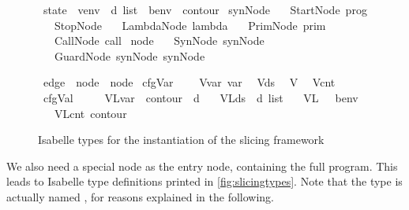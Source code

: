 \documentclass[a4paper,halfparskip,DIV=10,11pt]{scrbook}
\begin{document}
\begin{figure}
\begin{framed}
\begin{minipage}[t]{.5\linewidth}
\begin{isabellebody}
\isamarkupfalse%
\ state\ {\isacharequal}\ {\isachardoublequoteopen}venv\ {\isasymtimes}\ d\ list\ {\isasymtimes}\ benv\ {\isasymtimes}\ contour{\isachardoublequoteclose}\isanewline
\isanewline
{}\isamarkupfalse%
\ synNode\isanewline
\ \ {\isacharequal}\ StartNode\ prog\isanewline
\ \ {\isacharbar}\ StopNode\isanewline
\ \ {\isacharbar}\ LambdaNode\ lambda\isanewline
\ \ {\isacharbar}\ PrimNode\ prim\isanewline
\ \ {\isacharbar}\ CallNode\ call\isanewline
\isanewline
{}\isamarkupfalse%
\ node\isanewline
\ \ {\isacharequal}\ SynNode\ synNode\isanewline
\ \ {\isacharbar}\ GuardNode\ synNode\ synNode
\end{isabellebody}
\end{minipage}\hfill
\begin{minipage}[t]{.5\linewidth}
\begin{isabellebody}
\isamarkupfalse%
\ edge\ {\isacharequal}\ {\isachardoublequoteopen}node\ {\isasymtimes}\ node{\isachardoublequoteclose}\isanewline
\isanewline
{}\isamarkupfalse%
\ cfgVar\ {\isacharequal}\isanewline
\ \ \ Vvar\ var\isanewline
\ {\isacharbar}\ Vds\isanewline
\ {\isacharbar}\ V{\isasymbeta}\isanewline
\ {\isacharbar}\ Vcnt\isanewline
\isanewline
{}\isamarkupfalse%
\ cfgVal\ {\isacharequal}\ \isanewline
\ \ \ VLvar\ \ {\isachardoublequoteopen}contour\ {\isasymrightharpoonup}\ d{\isachardoublequoteclose}\isanewline
\ \ {\isacharbar}\ VLds\ \ {\isachardoublequoteopen}d\ list{\isachardoublequoteclose}\isanewline
\ \ {\isacharbar}\ VL{\isasymbeta}\ \ \ benv\isanewline
\ \ {\isacharbar}\ VLcnt\ contour
\end{isabellebody}
\end{minipage}
\end{framed}
\caption{Isabelle types for the instantiation of the slicing framework}
\label{fig:slicingtypes}
\end{figure}

We also need a special node as the entry node, containing the full program. This leads to Isabelle type definitions printed in \vref{fig:slicingtypes}. Note that the type is actually named , for reasons explained in the following.
\end{document}
